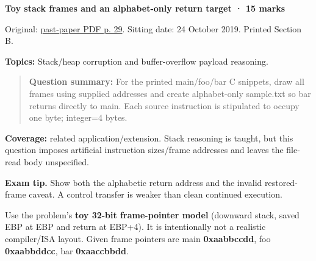 \documentclass[11pt,a4paper]{article}
\begin{document}
\textbf{Toy stack frames and an alphabet-only return target · 15 marks}


Original: \href{../../CSE405-Security_Merged.pdf\#page=29}{past-paper PDF p. 29}. Sitting date: 24 October 2019. Printed Section B.


\textbf{Topics:} Stack/\allowbreak{}heap corruption and buffer-overflow payload reasoning.



\begin{quote}\small

\textbf{Question summary:} For the printed main/\allowbreak{}foo/\allowbreak{}bar C snippets,\allowbreak{} draw all frames using supplied addresses and create alphabet-only sample.\allowbreak{}txt so bar returns directly to main. Each source instruction is stipulated to occupy one byte; integer=\allowbreak{}4 bytes.



\end{quote}

\textbf{Coverage:} related application/\allowbreak{}extension. Stack reasoning is taught,\allowbreak{} but this question imposes artificial instruction sizes/\allowbreak{}frame addresses and leaves the file-read body unspecified.



{\color{ForestGreen}\textbf{Exam tip.} Show both the alphabetic return address and the invalid restored-frame caveat. A control transfer is weaker than clean continued execution.}


Use the problem's \textbf{toy 32-bit frame-pointer model} (downward stack,\allowbreak{} saved EBP at EBP and return at EBP+4). It is intentionally not a realistic compiler/\allowbreak{}ISA layout. Given frame pointers are main \textbf{0xaabbccdd},\allowbreak{} foo \textbf{0xaabbddcc},\allowbreak{} bar \textbf{0xaaccbbdd}.
\end{document}
